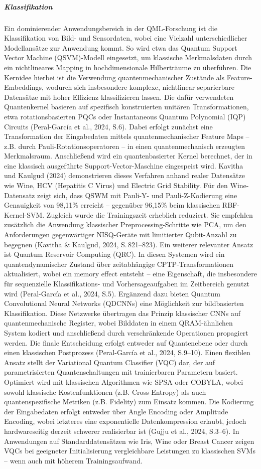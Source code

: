 \noindent
\subparagraph{Klassifikation}
Ein dominierender Anwendungsbereich in der QML-Forschung ist die Klassifikation von Bild- und Sensordaten, wobei eine Vielzahl unterschiedlicher Modellansätze zur Anwendung kommt. So wird etwa das Quantum Support Vector Machine (QSVM)-Modell eingesetzt, um klassische Merkmalsdaten durch ein nichtlineares Mapping in hochdimensionale Hilberträume zu überführen. Die Kernidee hierbei ist die Verwendung quantenmechanischer Zustände als Feature-Embeddings, wodurch sich insbesondere komplexe, nichtlinear separierbare Datensätze mit hoher Effizienz klassifizieren lassen. Die dafür verwendeten Quantenkernel basieren auf spezifisch konstruierten unitären Transformationen, etwa rotationsbasierten PQCs oder Instantaneous Quantum Polynomial (IQP) Circuits (Peral-García et al., 2024, S.6).
Dabei erfolgt zunächst eine Transformation der Eingabedaten mittels quantenmechanischer Feature Maps – z.B. durch Pauli-Rotationsoperatoren – in einen quantenmechanisch erzeugten Merkmalsraum. Anschließend wird ein quantenbasierter Kernel berechnet, der in eine klassisch ausgeführte Support-Vector-Maschine eingespeist wird. Kavitha und Kaulgud (2024) demonstrieren dieses Verfahren anhand realer Datensätze wie Wine, HCV (Hepatitis C Virus) und Electric Grid Stability. Für den Wine-Datensatz zeigt sich, dass QSWM mit Pauli-Y- und Pauli-Z-Kodierung eine Genauigkeit von 98{,}11\% erreicht – gegenüber 96{,}15\% beim klassischen RBF-Kernel-SVM. Zugleich wurde die Trainingszeit erheblich reduziert. Sie empfehlen zusätzlich die Anwendung klassischer Preprocessing-Schritte wie PCA, um den Anforderungen gegenwärtiger NISQ-Geräte mit limitierter Qubit-Anzahl zu begegnen (Kavitha \& Kaulgud, 2024, S.\,821–823).
Ein weiterer relevanter Ansatz ist Quantum Reservoir Computing (QRC). In diesen Systemen wird ein quantendynamischer Zustand über zeitabhängige CPTP-Transformationen aktualisiert, wobei ein memory effect entsteht – eine Eigenschaft, die insbesondere für sequenzielle Klassifikations- und Vorhersageaufgaben im Zeitbereich genutzt wird (Peral-García et al., 2024, S.5).
Ergänzend dazu bieten Quantum Convolutional Neural Networks (QDCNNs) eine Möglichkeit zur bildbasierten Klassifikation. Diese Netzwerke übertragen das Prinzip klassischer CNNs auf quantenmechanische Register, wobei Bilddaten in einem QRAM-ähnlichen System kodiert und anschließend durch verschränkende Operationen propagiert werden. Die finale Entscheidung erfolgt entweder auf Quantenebene oder durch einen klassischen Postprozess (Peral-García et al., 2024, S.9–10).
Einen flexiblen Ansatz stellt der Variational Quantum Classifier (VQC) dar, der auf parametrisierten Quantenschaltungen mit trainierbaren Parametern basiert. Optimiert wird mit klassischen Algorithmen wie SPSA oder COBYLA, wobei sowohl klassische Kostenfunktionen (z.B. Cross-Entropy) als auch quantenspezifische Metriken (z.B. Fidelity) zum Einsatz kommen. Die Kodierung der Eingabedaten erfolgt entweder über Angle Encoding oder Amplitude Encoding, wobei letzteres eine exponentielle Datenkompression erlaubt, jedoch hardwareseitig derzeit schwerer realisierbar ist (Gujju et al., 2024, S.3–6). In Anwendungen auf Standarddatensätzen wie Iris, Wine oder Breast Cancer zeigen VQCs bei geeigneter Initialisierung vergleichbare Leistungen zu klassischen SVMs – wenn auch mit höherem Trainingsaufwand.
